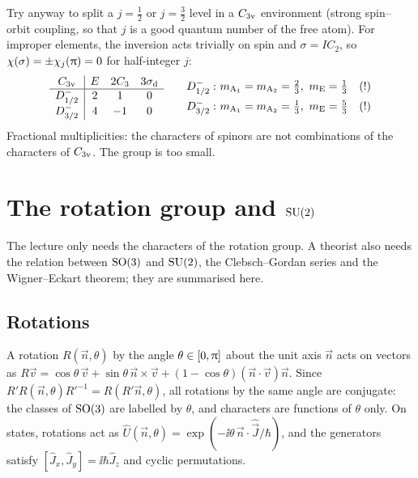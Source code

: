 Try anyway to split a $j=\tfrac12$ or $j=\tfrac32$ level in a $C_{3\mathrm{v}}$ environment
(strong spin--orbit coupling, so that $j$ is a good quantum number of the free atom).
For improper elements, the inversion acts trivially on spin and
$\sigma=IC_2$, so $\chi(\sigma)=\pm\chi_j(\uppi)=0$ for half-integer $j$:
\[
\begin{array}{c|ccc}
\Cv{3} & E & 2C_3 & 3\sd\\\hline
D_{1/2}^- & 2 & 1 & 0\\
D_{3/2}^- & 4 & -1 & 0
\end{array}
\qquad
\begin{aligned}
D_{1/2}^-:&\ m_{\irr{A}_1}=m_{\irr{A}_2}=\tfrac23,\ m_{\irr{E}}=\tfrac13 \quad(!)\\
D_{3/2}^-:&\ m_{\irr{A}_1}=m_{\irr{A}_2}=\tfrac13,\ m_{\irr{E}}=\tfrac53 \quad(!)
\end{aligned}
\]
Fractional multiplicities: the characters of spinors are not combinations of the
characters of $C_{3\mathrm{v}}$. The group is too small.

\section{The rotation group and \texorpdfstring{$\mathrm{SU}(2)$}{SU(2)}\beyondmark}\label{sec:su2}

The lecture only needs the characters of the rotation group. A theorist also needs the
relation between $\mathrm{SO}(3)$ and $\mathrm{SU}(2)$, the Clebsch--Gordan series and the
Wigner--Eckart theorem; they are summarised here.

\subsection{Rotations}
A rotation $R(\vec{n},\theta)$ by the angle $\theta\in[0,\uppi]$ about the unit axis $\vec{n}$
acts on vectors as
$R\vec{v}=\cos\theta\,\vec{v}+\sin\theta\,\vec{n}\times\vec{v}+(1-\cos\theta)(\vec{n}\cdot\vec{v})\vec{n}$.
Since $R'R(\vec{n},\theta)R'^{-1}=R(R'\vec{n},\theta)$, all rotations by the same angle
are conjugate: the classes of $\mathrm{SO}(3)$ are labelled by $\theta$, and characters are
functions of $\theta$ only. On states, rotations act as
$\hat{U}(\vec{n},\theta)=\exp(-\ii\theta\,\vec{n}\cdot\hat{\vec{J}}/\hbar)$, and the
generators satisfy $[\hat{J}_x,\hat{J}_y]=\ii\hbar\hat{J}_z$ and cyclic permutations.

